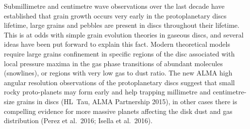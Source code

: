 \documentclass[10pt,fleqn,twoside]{article}
\begin{document}
Submillimetre and centimetre wave observations over the last decade have established that grain growth occurs very early in the protoplanetary discs lifetime, large grains and pebbles are present in discs throughout their lifetime. This is at odds with simple grain evolution theories in gaseous discs, and several ideas have been put forward to explain this fact. Modern theoretical models require large grains confinement in specific regions of the disc associated with local pressure maxima in the gas phase transitions of abundant molecules (snowlines), or regions with very low gas to dust ratio. The new ALMA high angular resolution observations of the protoplanetary discs suggest that small rocky proto-planets may form early and help trapping millimetre and centimetre-size grains in discs (HL~Tau, ALMA Partnership 2015), in other cases there is compelling evidence for more massive planets affecting the disk dust and gas distribution (Perez et al.~2016; Isella et al.~2016).  
\end{document}
